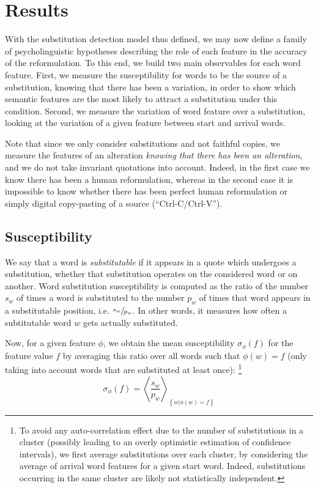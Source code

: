 \section{Results}\label{sec:results}


With the substitution detection model thus defined, we may now define a family of psycholinguistic hypotheses describing the role of each feature in the accuracy of the reformulation.  To this end, we build two main observables for each word feature.  
First, we measure the susceptibility for words to be the source of a substitution, knowing that there has been a variation, in order to show which semantic features are the most likely to attract a substitution under this condition. Second, we measure the variation of word feature over a substitution, looking at the variation of a given feature between start and arrival words.

Note that since we only consider substitutions and not faithful copies, we measure the features of an alteration \emph{knowing that there has been an alteration}, and we do not take invariant quotations into account.  Indeed, in the first case we know there has been a human reformulation, whereas in the second case it is impossible to know whether there has been perfect human reformulation or simply digital copy-pasting of a source (``{\sc Ctrl-C}/{\sc Ctrl-V}'').


\subsection{Susceptibility}

We say that a word is \emph{substitutable} if it appears in a quote which undergoes a substitution, whether that substitution operates on the considered word or on another.
Word substitution susceptibility is computed as the ratio of the number $s_w$ of times a word is substituted to the number $p_w$ of times that word appears in a substitutable position, i.e. $\sfrac{s_w}{p_w}$. In other words, it measures how often a subtitutable word $w$ gets actually substituted.

Now, for a given feature $\phi$, we obtain the mean susceptibility $\sigma_{\phi}(f)$ for the feature value $f$ by averaging this ratio over all words such that $\phi(w) = f$ (only taking into account words that are substituted at least once):
\footnote{To avoid any auto-correlation effect due to the number of substitutions in a cluster (possibly leading to an overly optimistic estimation of confidence intervals), we first average substitutions over each cluster, by considering the average of arrival word features for a given start word.
Indeed, substitutions occurring in the same cluster are likely not statistically independent.}
$$\sigma_{\phi}(f) = \left< \frac{s_w}{p_w} \right>_{\left\lbrace w | \phi(w) = f \right\rbrace}$$

